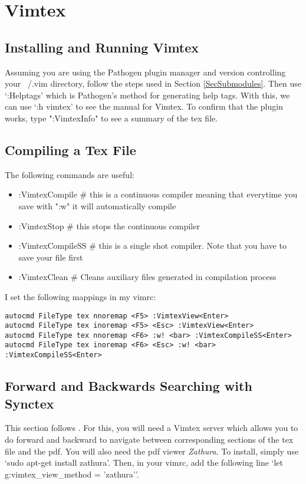 \documentclass[10pt]{article}
\begin{document}
\section{Vimtex}
\subsection{Installing and Running Vimtex}
Assuming you are using the Pathogen plugin manager and version controlling your
~/.vim directory, follow the steps used in Section \ref{SecSubmodules}. Then use
`:Helptags' which is Pathogen's method for generating help tags. With this, we
can use `:h vimtex' to see the manual for Vimtex. To confirm that the plugin
works, type ":VimtexInfo" to see a summary of the tex file.
\subsection{Compiling a Tex File}
The following commands are useful:
\begin{itemize}
    \item :VimtexCompile \# this is a continuous compiler meaning that everytime
        you save with ":w" it will automatically compile
    \item :VimtexStop \# this stops the continuous compiler
    \item :VimtexCompileSS \# this is a single shot compiler. Note that you have
        to save your file first \item :VimtexClean \# Cleans auxiliary files
        generated in compilation process 
\end{itemize}
I set the following mappings in my vimrc:
\begin{lstlisting}
autocmd FileType tex nnoremap <F5> :VimtexView<Enter>
autocmd FileType tex inoremap <F5> <Esc> :VimtexView<Enter>
autocmd FileType tex nnoremap <F6> :w! <bar> :VimtexCompileSS<Enter>
autocmd FileType tex inoremap <F6> <Esc> :w! <bar> :VimtexCompileSS<Enter>
\end{lstlisting}

\subsection{Forward and Backwards Searching with Synctex}
This section follows \cite{gunther2014vimtex}. For this, you will need a Vimtex
server which allows you to do forward and backward to navigate between
corresponding sections of the tex file and the pdf. You will also need the pdf
viewer \textit{Zathura}. To install, simply use `sudo apt-get install zathura'.
Then, in your vimrc, add the following line `let g:vimtex\_view\_method =
'zathura''.\\
\end{document}

